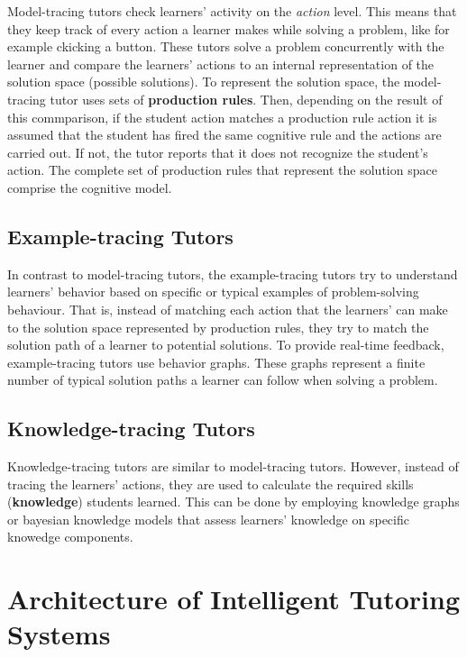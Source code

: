 \documentclass[
]{book}
\begin{document}
Model-tracing tutors check learners' activity on the \emph{action} level. This means that they keep track of every action a learner makes while solving a problem, like for example ckicking a button. These tutors solve a problem concurrently with the learner and compare the learners' actions to an internal representation of the solution space (possible solutions). To represent the solution space, the model-tracing tutor uses sets of \textbf{production rules}. Then, depending on the result of this commparison, if the student action matches a production rule action it is assumed that the student has fired the same cognitive rule and the actions are carried out. If not, the tutor reports that it does not recognize the student's action.
The complete set of production rules that represent the solution space comprise the cognitive model.

\subsection{Example-tracing Tutors}\label{example-tracing-tutors}

In contrast to model-tracing tutors, the example-tracing tutors try to understand learners' behavior based on specific or typical examples of problem-solving behaviour. That is, instead of matching each action that the learners' can make to the solution space represented by production rules, they try to match the solution path of a learner to potential solutions. To provide real-time feedback, example-tracing tutors use behavior graphs. These graphs represent a finite number of typical solution paths a learner can follow when solving a problem.

\subsection{Knowledge-tracing Tutors}\label{knowledge-tracing-tutors}

Knowledge-tracing tutors are similar to model-tracing tutors. However, instead of tracing the learners' actions, they are used to calculate the required skills (\textbf{knowledge}) students learned. This can be done by employing knowledge graphs or bayesian knowledge models that assess learners' knowledge on specific knowedge components.

\section{Architecture of Intelligent Tutoring Systems}\label{architecture-of-intelligent-tutoring-systems}
\end{document}
